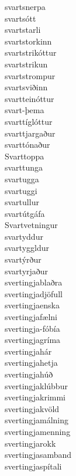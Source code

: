\documentclass[../samsetningasafn.tex]{subfiles}
\begin{document}
\begin{bigwordlist}
\begin{footnotesize}
\begin{multicols}{4}
\begin{description}
		\item [svartsnerpa]
		\item [svartsótt]
		\item [svartstarli]
		\item [svartstorkinn]
		\item [svartstrikóttur]
		\item [svartstrikun]
		\item [svartstrompur]
		\item [svartsviðinn]
		\item [svartteinóttur]
		\item [svart-þema]
		\item [svarttíglóttur]
		\item [svarttjargaður]
		\item [svarttónaður]
		\item [Svarttoppa]
		\item [svarttunga]
		\item [svartugga]
		\item [svartuggi]
		\item [svartullur]
		\item [svartútgáfa]
		\item [Svartvetningur]
		\item [svartyddur]
		\item [svartyggldur]
		\item [svartýrður]
		\item [svartyrjaður]	
		\item [svertingjablaðra]
		\item [svertingjadjöfull]
		\item [svertingjaenska]
		\item [svertingjafælni]
		\item [svertingja-fóbía]
		\item [svertingjagríma]
		\item [svertingjahár]
		\item [svertingjahetja]
		\item [svertingjahúð]
		\item [svertingjaklúbbur]
		\item [svertingjakrimmi]
		\item [svertingjakvöld]
		\item [svertingjamálning]
		\item [svertingjamenning]
		\item [svertingjarokk]
		\item [svertingjasamband]
		\item [svertingjaspítali]

\end{description}
\end{multicols}
\end{footnotesize}
\end{bigwordlist}
\end{document}
